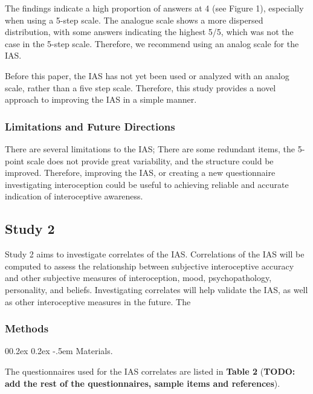 \documentclass[
  man,
  floatsintext,
  longtable,
  nolmodern,
  notxfonts,
  notimes,
  colorlinks=true,linkcolor=blue,citecolor=blue,urlcolor=blue]{apa7}
\makeatletter
\renewcommand{\paragraph}{\@startsection{paragraph}{4}{\parindent}%
	{0\baselineskip \@plus 0.2ex \@minus 0.2ex}%
	{-.5em}%
	{\normalfont\normalsize\bfseries\typesectitle}}
\makeatother
\begin{document}
The findings indicate a high proportion of answers at 4 (see Figure 1),
especially when using a 5-step scale. The analogue scale shows a more
dispersed distribution, with some answers indicating the highest 5/5,
which was not the case in the 5-step scale. Therefore, we recommend
using an analog scale for the IAS.

Before this paper, the IAS has not yet been used or analyzed with an
analog scale, rather than a five step scale. Therefore, this study
provides a novel approach to improving the IAS in a simple manner.

\subsubsection{Limitations and Future
Directions}\label{limitations-and-future-directions}

There are several limitations to the IAS; There are some redundant
items, the 5-point scale does not provide great variability, and the
structure could be improved. Therefore, improving the IAS, or creating a
new questionnaire investigating interoception could be useful to
achieving reliable and accurate indication of interoceptive awareness.

\subsection{Study 2}\label{study-2}

Study 2 aims to investigate correlates of the IAS. Correlations of the
IAS will be computed to assess the relationship between subjective
interoceptive accuracy and other subjective measures of interoception,
mood, psychopathology, personality, and beliefs. Investigating
correlates will help validate the IAS, as well as other interoceptive
measures in the future. The

\subsubsection{Methods}\label{methods-1}

\paragraph{Materials.}\label{materials}

The questionnaires used for the IAS correlates are listed in
\textbf{Table 2} (\textbf{TODO: add the rest of the questionnaires,
sample items and references}).
\end{document}
